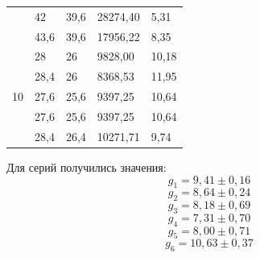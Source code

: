 \documentclass[a4paper,12pt]{article}
\begin{document}
\begin{center}
\begin{tabular}{|l|l|l|l|l|}
                          & 42                         & 39,6                       & 28274,40                                     & 5,31                                          \\
                          & 43,6                       & 39,6                       & 17956,22                                     & 8,35                                          \\ \hline
\multirow{5}{*}{10}       & 28                         & 26                         & 9828,00                                      & 10,18                                         \\
                          & 28,4                       & 26                         & 8368,53                                      & 11,95                                         \\
                          & 27,6                       & 25,6                       & 9397,25                                      & 10,64                                         \\
                          & 27,6                       & 25,6                       & 9397,25                                      & 10,64                                         \\
                          & 28,4                       & 26,4                       & 10271,71                                     & 9,74         
                          \\ \hline
\end{tabular}
\end{center}
\clearpage
Для серий получились значения:
$$ g_1 = 9,41 \pm 0,16$$
$$ g_2 = 8,64 \pm 0,24$$
$$ g_3 = 8,18 \pm 0,69$$
$$ g_4 = 7,31 \pm 0,70$$
$$ g_5 = 8,00 \pm 0,71$$
$$ g_6 = 10,63 \pm0,37$$
\end{document}
